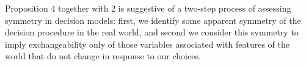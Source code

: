 Proposition 4 together with 2 is suggestive of a two-step process of assessing symmetry in decision models: first, we identify some apparent symmetry of the decision procedure in the real world, and second we consider this symmetry to imply exchangeability only of those variables associated with features of the world that do not change in response to our choices.




